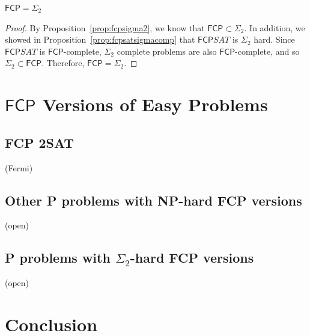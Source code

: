 \documentclass[runningheads,a4paper]{llncs}
\begin{document}
\begin{theorem}
$\mathsf{FCP} = \Sigma_2$
\end{theorem}

\begin{proof}
By Proposition~\ref{prop:fcpsigma2}, we know that $\mathsf{FCP} \subset \Sigma_2$. In addition, we showed in Proposition~\ref{prop:fcpsatsigmacomp} that $\mathsf{FCP} SAT$ is $\Sigma_2$ hard. Since $\mathsf{FCP} SAT$ is $\mathsf{FCP}$-complete, $\Sigma_2$ complete problems are also $\mathsf{FCP}$-complete, and so $\Sigma_2 \subset \mathsf{FCP}$. Therefore, $\mathsf{FCP} = \Sigma_2$. 
\end{proof}

\section{$\mathsf{FCP}$ Versions of Easy Problems}

\subsection{FCP 2SAT} 
(Fermi)

\subsection{Other P problems with NP-hard FCP versions}

(open)

\subsection{P problems with $\Sigma_2$-hard FCP versions}

(open)

\section{Conclusion}
\label{sec:conclusion}




\end{document}
